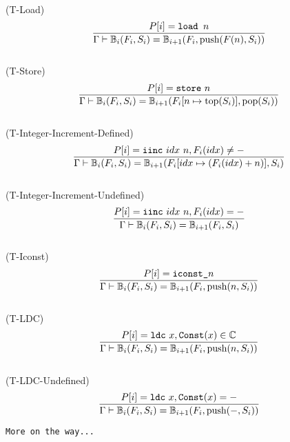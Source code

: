 \documentclass{amsart}
\newcommand{\C}{\mathbb{C}}
\newcommand{\bB}[1]{\mathbb{B}_{#1}}
\newcommand{\Const}{\texttt{Const}}
\numberwithin{equation}{section}
\theoremstyle{plain} %
\theoremstyle{definition}
\theoremstyle{remark}
\begin{document}
\\
(T-Load)
\begin{equation*}
\frac{P[i] = \text{\texttt{load }} n}
{\Gamma \vdash \bB{i}(F_i, S_i) = \bB{i+1}(F_i, \text{push}(F(n), S_i))}
\end{equation*}
\\
(T-Store)
\begin{equation*}
\frac{P[i] = \text{\texttt{store} } n}
{\Gamma \vdash \bB{i}(F_i, S_i) = \bB{i+1}(F_i[n \mapsto \text{top}(S_i)], \text{pop}(S_i))}
\end{equation*}
\\
(T-Integer-Increment-Defined)
\begin{equation*}
\frac{P[i] = \text{\texttt{iinc} } idx~n, F_i(idx) \neq -}
{\Gamma \vdash \bB{i}(F_i, S_i) = \bB{i+1}(F_i[idx \mapsto (F_i(idx) + n)], S_i)}
\end{equation*}
\\
(T-Integer-Increment-Undefined)
\begin{equation*}
\frac{P[i] = \text{\texttt{iinc} } idx~n, F_i(idx) = -}
{\Gamma \vdash \bB{i}(F_i, S_i) = \bB{i+1}(F_i, S_i)}
\end{equation*}
\\
(T-Iconst)
\begin{equation*}
\frac{P[i] = \text{\texttt{iconst\_}}n}
{\Gamma \vdash \bB{i}(F_i, S_i) = \bB{i+1}(F_i, \text{push}(n, S_i))}
\end{equation*}
\\
(T-LDC)
\begin{equation*}
\frac{P[i] = \text{\texttt{ldc} } x, \Const{}(x) \in \C{}}
{\Gamma \vdash \bB{i}(F_i, S_i) = \bB{i+1}(F_i, \text{push}(n, S_i))}
\end{equation*}
\\
(T-LDC-Undefined)
\begin{equation*}
\frac{P[i] = \text{\texttt{ldc} } x, \Const{}(x) = -}
{\Gamma \vdash \bB{i}(F_i, S_i) = \bB{i+1}(F_i, \text{push}(-, S_i))}
\end{equation*}

\texttt{More on the way...}
\end{document}

